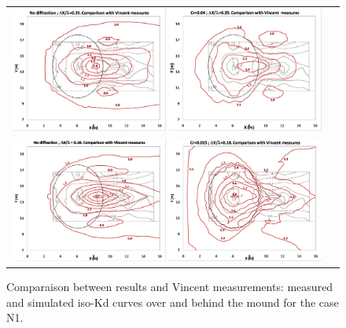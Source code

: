 \begin{figure}[H]
  \centering
\begin{tabular}{cc}
    \includegraphics[width=0.49\textwidth]{iso-Kd_nodiff_dx035.jpg}
    \includegraphics[width=0.49\textwidth]{iso-Kd_cr004-dx035.jpg}\\
    \includegraphics[width=0.49\textwidth]{iso-Kd_nodiff_dx018.jpg}
    \includegraphics[width=0.49\textwidth]{iso-Kd_cr0015_dx018.jpg}\\
\end{tabular}
\caption{Comparaison between \tomawac results and Vincent measurements: measured
  and simulated iso-Kd curves over and behind the mound for the case N1.}
\label {comparisonN1}
\end{figure}


